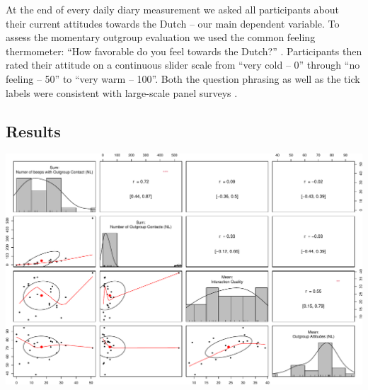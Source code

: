 At the end of every daily diary measurement we asked all participants
about their current attitudes towards the Dutch -- our main dependent
variable. To assess the momentary outgroup evaluation we used the common
feeling thermometer: ``How favorable do you feel towards the Dutch?''
\citep[][]{Lavrakas2008}. Participants then rated their attitude on a
continuous slider scale from ``very cold -- 0'' through ``no feeling --
50'' to ``very warm -- 100''. Both the question phrasing as well as the
tick labels were consistent with large-scale panel surveys
\citep[e.g.,][]{DeBell2010}.




\subsection{Results}

\begin{Shaded}
\begin{Highlighting}[]
\NormalTok{(}
\SpecialCharTok{$}\SpecialCharTok{\%\textgreater{}\%} 
   \NormalTok{(}
    \NormalTok{,}
    \NormalTok{,}
    \NormalTok{,}
\NormalTok{  )}
\NormalTok{)}
\end{Highlighting}
\end{Shaded}

\includegraphics{Figures/WorkerFreqAttCor-1.pdf}

